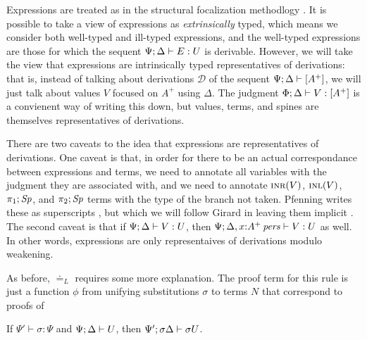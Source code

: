 Expressions are treated as in the structural 
focalization methodlogy \cite{simmons11structural}. It is possible
to take a view of expressions as {\it extrinsically} typed, which
means we consider both well-typed and ill-typed expressions, and 
the well-typed expressions are those for which the sequent 
${\Psi}; {\Delta} \vdash {E} : {U}$ is derivable. However, we will take
the view that expressions are intrinsically typed representatives 
of derivations: that is, instead of talking about derivations 
$\mathcal D$ of the sequent ${\Psi};{\Delta} \vdash {[A^+]}$, we will just talk
about values $V$ focused on $A^+$ using $\Delta$. The judgment
${\Phi}; {\Delta} \vdash {V} : {[A^+]}$ is a convienent way of writing this 
down, but values, terms, and spines are themselves representatives
of derivations. 

There are two caveats to the idea that expressions are representatives
of derivations. One caveat is that, in order for there to be an actual
correspondance between expressions and terms, we need to annotate all
variables with the judgment they are associated with, and we need to
annotate $\textsc{inr}({V})$, $\textsc{inl}({V})$, $\pi_1;{{\it Sp}}$, and $\pi_2;{{\it Sp}}$
terms with the type of the branch not taken. Pfenning writes these as
superscripts \cite{pfenning08church}, but which we will follow Girard
in leaving them implicit \cite{girard89proofs}. The second caveat is
that if ${\Psi}; {\Delta} \vdash {V} : {U}$, then ${\Psi}; {\Delta,
  x{:}{A^+}\,{{\it pers}}} \vdash {V} : {U}$ as well. In other words, expressions are
only representaives of derivations modulo weakening.

As before, ${\doteq}_L$ requires some more explanation. 
The proof term for this rule is just a function $\phi$ from unifying
substitutions $\sigma$ to terms $N$ that correspond to proofs of 

\bigskip
\begin{theorem}
If $\Psi' \vdash \sigma : \Psi$ and ${\Psi};{\Delta} \vdash {U}$, then 
${\Psi'};{\sigma\Delta} \vdash {\sigma{U}}$.
\end{theorem}

